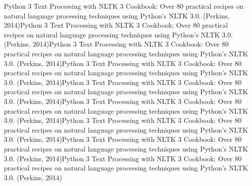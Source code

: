 Python 3 Text Processing with NLTK 3 Cookbook: Over 80 practical recipes on natural language processing techniques using Python's NLTK 3.0. (Perkins, 2014)Python 3 Text Processing with NLTK 3 Cookbook: Over 80 practical recipes on natural language processing techniques using Python's NLTK 3.0. (Perkins, 2014)Python 3 Text Processing with NLTK 3 Cookbook: Over 80 practical recipes on natural language processing techniques using Python's NLTK 3.0. (Perkins, 2014)Python 3 Text Processing with NLTK 3 Cookbook: Over 80 practical recipes on natural language processing techniques using Python's NLTK 3.0. (Perkins, 2014)Python 3 Text Processing with NLTK 3 Cookbook: Over 80 practical recipes on natural language processing techniques using Python's NLTK 3.0. (Perkins, 2014)Python 3 Text Processing with NLTK 3 Cookbook: Over 80 practical recipes on natural language processing techniques using Python's NLTK 3.0. (Perkins, 2014)Python 3 Text Processing with NLTK 3 Cookbook: Over 80 practical recipes on natural language processing techniques using Python's NLTK 3.0. (Perkins, 2014)Python 3 Text Processing with NLTK 3 Cookbook: Over 80 practical recipes on natural language processing techniques using Python's NLTK 3.0. (Perkins, 2014)Python 3 Text Processing with NLTK 3 Cookbook: Over 80 practical recipes on natural language processing techniques using Python's NLTK 3.0. (Perkins, 2014)


